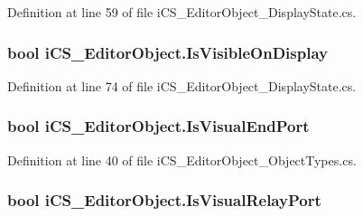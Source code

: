 Definition at line 59 of file i\+C\+S\+\_\+\+Editor\+Object\+\_\+\+Display\+State.\+cs.

\hypertarget{classi_c_s___editor_object_a937600bf39dc87094fb54685eeb504e6}{
\subsubsection[{Is\+Visible\+On\+Display}]{\setlength{\rightskip}{0pt plus 5cm}bool i\+C\+S\+\_\+\+Editor\+Object.\+Is\+Visible\+On\+Display\hspace{0.3cm}{\ttfamily [get]}}}\label{classi_c_s___editor_object_a937600bf39dc87094fb54685eeb504e6}


Definition at line 74 of file i\+C\+S\+\_\+\+Editor\+Object\+\_\+\+Display\+State.\+cs.

\hypertarget{classi_c_s___editor_object_a2198ea51c2e1bef90fe3ce699874e55f}{
\subsubsection[{Is\+Visual\+End\+Port}]{\setlength{\rightskip}{0pt plus 5cm}bool i\+C\+S\+\_\+\+Editor\+Object.\+Is\+Visual\+End\+Port\hspace{0.3cm}{\ttfamily [get]}}}\label{classi_c_s___editor_object_a2198ea51c2e1bef90fe3ce699874e55f}


Definition at line 40 of file i\+C\+S\+\_\+\+Editor\+Object\+\_\+\+Object\+Types.\+cs.

\hypertarget{classi_c_s___editor_object_a78d3dfc339938bf73f1f36d0e888ec32}{
\subsubsection[{Is\+Visual\+Relay\+Port}]{\setlength{\rightskip}{0pt plus 5cm}bool i\+C\+S\+\_\+\+Editor\+Object.\+Is\+Visual\+Relay\+Port\hspace{0.3cm}{\ttfamily [get]}}}\label{classi_c_s___editor_object_a78d3dfc339938bf73f1f36d0e888ec32}


